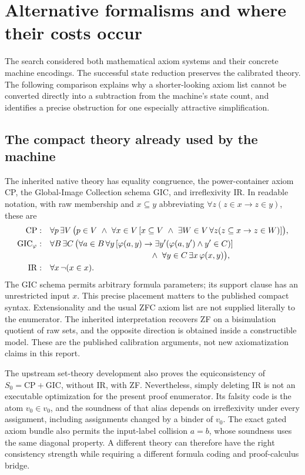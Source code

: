 \section{Alternative formalisms and where their costs occur}
\label{sec:formalism-routes}

The search considered both mathematical axiom systems and their concrete
machine encodings. The successful state reduction preserves the calibrated
theory. The following comparison explains why a shorter-looking axiom
list cannot be converted directly into a subtraction from the machine's
state count, and identifies a precise obstruction for one especially
attractive simplification.

\subsection{The compact theory already used by the machine}

The inherited native theory has equality congruence, the power-container
axiom CP, the Global-Image Collection schema GIC, and irreflexivity IR.
In readable notation, with raw membership and
$x\subseteq y$ abbreviating $\forall z(z\in x\to z\in y)$, these are
\begin{align*}
\mathrm{CP}:\quad
 &\forall p\,\exists V\,
 \bigl(p\in V\ \land\
   \forall x\in V\,[x\subseteq V\ \land\
      \exists W\in V\,\forall z(z\subseteq x\to z\in W)]\bigr),\\
\mathrm{GIC}_{\varphi}:\quad
 &\forall B\,\exists C\,
 \bigl(\forall a\in B\,\forall y\,
   [\varphi(a,y)\to\exists y'(\varphi(a,y')\land y'\in C)]\\[-2pt]
 &\hspace{43mm}\land\ \forall y\in C\,\exists x\,\varphi(x,y)\bigr),\\
\mathrm{IR}:\quad &\forall x\,\neg(x\in x).
\end{align*}
The GIC schema permits arbitrary formula parameters; its support clause
has an unrestricted input $x$. This precise placement matters to the
published compact syntax. Extensionality and the usual ZFC axiom list
are not supplied literally to the enumerator. The inherited interpretation
recovers ZF on a bisimulation quotient of raw sets, and the opposite
direction is obtained inside a constructible model. These are the
published calibration arguments, not new axiomatization claims in this
report.\cite{upstream-settheory,calibration}

The upstream set-theory development also proves the equiconsistency of
$S_0=\mathrm{CP}+\mathrm{GIC}$, without IR, with ZF. Nevertheless, simply
deleting IR is not an executable optimization for the present proof
enumerator. Its falsity code is the atom $v_0\in v_0$, and the soundness
of that alias depends on irreflexivity under every assignment, including
assignments changed by a binder of $v_0$. The exact gated axiom bundle
also permits the input-label collision $a=b$, whose soundness uses the
same diagonal property. A different theory can therefore have the right
consistency strength while requiring a different formula coding and
proof-calculus bridge.\cite{upstream-logic,upstream-settheory}

